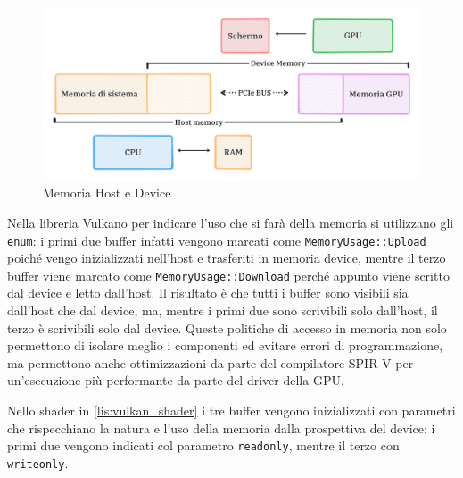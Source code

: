 \begin{figure}[ht]
    \centering
    \includegraphics[width=.9\linewidth]{images/chapter2/host_device_mem.png}
    \caption{Memoria Host e Device}
    \label{fig:host_device_mem}
\end{figure}

Nella libreria Vulkano per indicare l'uso che si farà della memoria si utilizzano gli \verb|enum|: i primi due buffer infatti vengono marcati come \verb|MemoryUsage::Upload| poiché vengo inizializzati nell'host e trasferiti in memoria device, mentre il terzo buffer viene marcato come \verb|MemoryUsage::Download| perché appunto viene scritto dal device e letto dall'host. Il risultato è che tutti i buffer sono visibili sia dall'host che dal device, ma, mentre i primi due sono scrivibili solo dall'host, il terzo è scrivibili solo dal device. Queste politiche di accesso in memoria non solo permettono di isolare meglio i componenti ed evitare errori di programmazione, ma permettono anche ottimizzazioni da parte del compilatore SPIR-V per un'esecuzione più performante da parte del driver della GPU.

Nello shader in \ref{lis:vulkan_shader} i tre buffer vengono inizializzati con parametri che rispecchiano la natura e l'uso della memoria dalla prospettiva del device: i primi due vengono indicati col parametro \verb|readonly|, mentre il terzo con \verb|writeonly|. 

